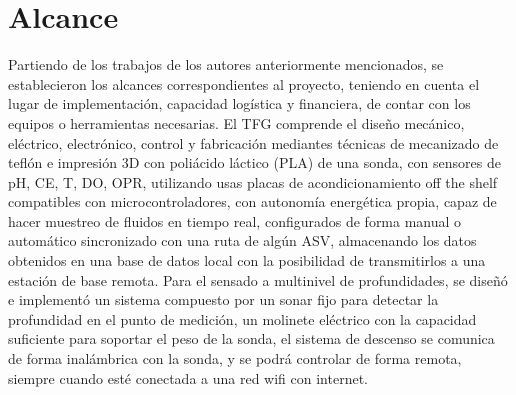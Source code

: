 \section{Alcance}
Partiendo de los trabajos de los autores anteriormente mencionados, se establecieron los alcances correspondientes al proyecto, teniendo en cuenta el lugar de implementaci\'on, capacidad logística y financiera, de contar con los equipos o herramientas necesarias.
El TFG comprende el diseño mecánico, eléctrico, electrónico, control y fabricaci\'on  mediantes técnicas de mecanizado de teflón e impresión 3D con poliácido láctico (PLA) de una sonda, con sensores de pH, CE, T, DO, OPR, utilizando usas placas de acondicionamiento off the shelf compatibles con microcontroladores, con autonomía energética propia, capaz de hacer muestreo de fluidos en tiempo real, configurados de forma manual o automático sincronizado con una ruta de algún ASV, almacenando los datos obtenidos en una base de datos local con la posibilidad de transmitirlos a una estación de base remota. 
Para el sensado a multinivel de profundidades, se diseñó e implementó un sistema compuesto por un sonar fijo para detectar la profundidad en el punto de medición, un molinete eléctrico con la capacidad suficiente para soportar el peso de la sonda, 
el sistema de descenso se comunica de forma inalámbrica con la sonda, y se podrá controlar de forma remota, siempre cuando est\'e conectada a una red wifi con internet.